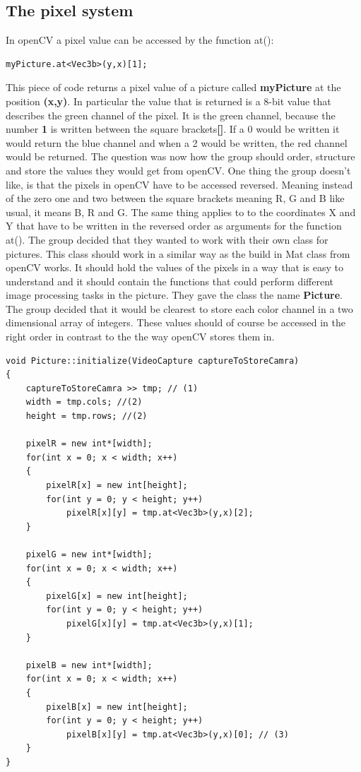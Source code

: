 \subsection{The pixel system}
In openCV a pixel value can be accessed by the function at():
\begin{lstlisting}
myPicture.at<Vec3b>(y,x)[1];
\end{lstlisting}
This piece of code returns a pixel value of a picture called \textbf{myPicture} at the position \textbf{(x,y)}. In particular the value that is returned is a 8-bit value that describes the green channel of the pixel. It is the green channel, because the number \textbf{1} is written between the square brackets\textbf{[]}. If a 0 would be written it would return the blue channel and when a 2 would be written, the red channel would be returned.
The question was now how the group should order, structure and store the values they would get from openCV. One thing the group doesn't like, is that the pixels in openCV have to be accessed reversed.  Meaning instead of the zero one and two between the square brackets meaning R, G and B like usual, it means B, R and G. The same thing applies to to the coordinates X and Y that have to be written in the reversed order as arguments for the function at().
The group decided that they wanted to work with their own class for pictures. This class should work in a similar way as the build in Mat class from openCV works. It should hold the values of the pixels in a way that is easy to understand and it should contain the functions that could perform different image processing tasks in the picture. They gave the class the name \textbf{Picture}.
The group decided that it would be clearest to store each color channel in a two dimensional array of integers. These values should of course be accessed in the right order in contrast to the the way openCV stores them in.
\begin{lstlisting}
void Picture::initialize(VideoCapture captureToStoreCamra)
{
	captureToStoreCamra >> tmp; // (1)
	width = tmp.cols; //(2)
	height = tmp.rows; //(2)

	pixelR = new int*[width];
	for(int x = 0; x < width; x++)
	{
		pixelR[x] = new int[height];
		for(int y = 0; y < height; y++)
			pixelR[x][y] = tmp.at<Vec3b>(y,x)[2];
	}

	pixelG = new int*[width];
	for(int x = 0; x < width; x++)
	{
		pixelG[x] = new int[height];
		for(int y = 0; y < height; y++)
			pixelG[x][y] = tmp.at<Vec3b>(y,x)[1];
	}

	pixelB = new int*[width];
	for(int x = 0; x < width; x++)
	{
		pixelB[x] = new int[height];
		for(int y = 0; y < height; y++)
			pixelB[x][y] = tmp.at<Vec3b>(y,x)[0]; // (3)
	}
}
\end{lstlisting}
